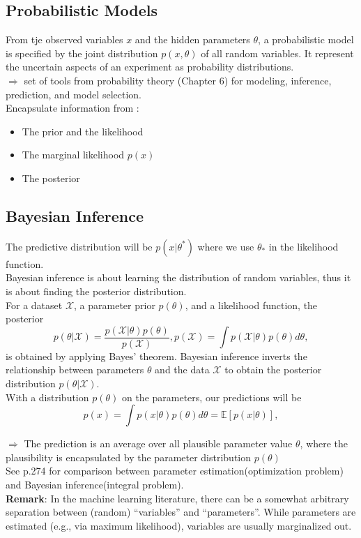 \subsection{Probabilistic Models}
From tje observed variables $x$ and the hidden parameters $\theta$, a probabilistic model is specified by the joint distribution $p(x, \theta)$ of all random variables. It represent the uncertain aspects of an experiment as probability distributions. \\
$\Rightarrow$ set of tools from probability theory (Chapter 6) for modeling, inference, prediction, and model selection. \\
Encapsulate information from : 
\begin{itemize}
	\item The prior and the likelihood
	\item The marginal likelihood $p(x)$
	\item The posterior
\end{itemize}

\subsection{Bayesian Inference}
The predictive distribution will be $p(x|\theta^{\ast})$ where we use $\theta_\ast$ in the likelihood function.  \\
Bayesian inference is about learning the distribution of random variables, thus it is about finding the posterior distribution.\\
For a dataset $\mathcal{X}$, a parameter prior $p(\theta)$, and a likelihood function, the posterior 
\[
p(\theta | \mathcal{X}) = \frac{p(\mathcal{X} | \theta) p(\theta)}{p(\mathcal{X})}, p(\mathcal{X}) = \int p(\mathcal{X} | \theta) p(\theta) d\theta, \tag{8.22}
\]
is obtained by applying Bayes' theorem. Bayesian inference inverts the relationship between parameters $\theta$ and the data $\mathcal{X}$ to obtain the posterior distribution $p(\theta | \mathcal{X})$.\\
With a distribution $p(\theta)$ on the parameters, our predictions will be 
\[
p(x) = \int p(x|\theta) p(\theta) d\theta = \mathbb{E} [p(x|\theta)], \tag{8.23}
\]

$\Rightarrow$ The prediction is an average over all plausible parameter value $\theta$, where the plausibility is encapsulated by the parameter distribution $p(\theta)$ \\
See p.274 for comparison between parameter estimation(optimization problem) and Bayesian inference(integral problem). \\
\textbf{Remark}: In the machine learning literature, there can be a somewhat arbitrary separation between (random) “variables” and “parameters”. While parameters are estimated (e.g., via maximum likelihood), variables are usually marginalized out.

